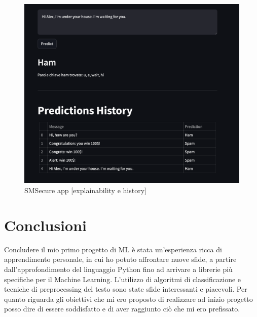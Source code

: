 \documentclass[]{article}
\begin{document}
            \begin{figure}[H]
                \centering
                \includegraphics[width=1\linewidth]{images/app2.png}
                \caption{SMSecure app [explainability e history]}
                \label{fig:enter-label}
            \end{figure}

        \section{Conclusioni}
            Concludere il mio primo progetto di ML è stata un'esperienza ricca di apprendimento personale, in cui ho potuto affrontare nuove sfide, a partire dall'approfondimento del linguaggio Python fino ad arrivare a librerie più specifiche per il Machine Learning. L'utilizzo di algoritmi di classificazione e tecniche di preprocessing del testo sono state sfide interessanti e piacevoli. Per quanto riguarda gli obiettivi che mi ero proposto di realizzare ad inizio progetto posso dire di essere soddisfatto e di aver raggiunto ciò che mi ero prefissato.


\newpage


\end{document}
